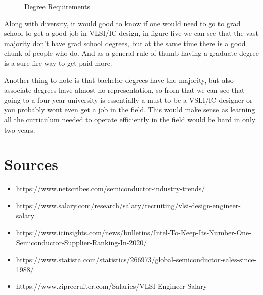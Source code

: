 \documentclass{article}
\begin{document}
\begin{figure}
  \begin{center}
  \end{center}
  \caption{Degree Requirements}
\end{figure}
Along with diversity, it would good to know if one would need to go to grad school to get a good job in 
VLSI/IC design, in figure five we can see that the vast majority don't have grad school degrees, but at the same time there is a good chunk of people who do. And as a general rule of thumb having a graduate degree is a sure fire way to get paid more.

Another thing to note is that bachelor degrees have the majority, but also associate degrees have almost no representation, so from that we can see that going to a four year university is essentially a must to be a VSLI/IC designer or you probably wont even get a job in the field. This would make sense as learning all the curriculum needed to operate efficiently in the field would be hard in only two years.


\section*{Sources}
\begin{itemize}
\item https://www.netscribes.com/semiconductor-industry-trends/
\item https://www.salary.com/research/salary/recruiting/vlsi-design-engineer-salary
\item https://www.icinsights.com/news/bulletins/Intel-To-Keep-Its-Number-One-Semiconductor-Supplier-Ranking-In-2020/
\item https://www.statista.com/statistics/266973/global-semiconductor-sales-since-1988/
\item https://www.ziprecruiter.com/Salaries/VLSI-Engineer-Salary
\end{itemize}
\end{document}
